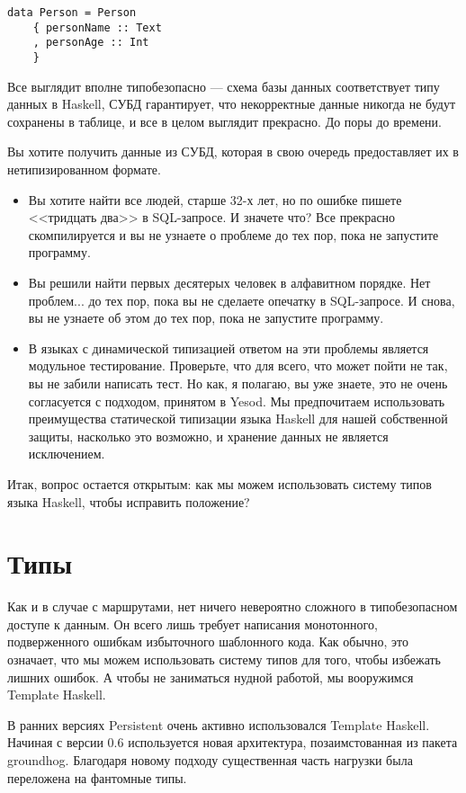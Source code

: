 \begin{lstlisting}
data Person = Person
    { personName :: Text
    , personAge :: Int
    }
\end{lstlisting}

Все выглядит вполне типобезопасно --- схема базы данных соответствует типу данных в Haskell, СУБД гарантирует, что некорректные данные никогда не будут сохранены в таблице, и все в целом выглядит прекрасно. До поры до времени.

Вы хотите получить данные из СУБД, которая в свою очередь предоставляет их в нетипизированном формате.

\begin{itemize}
  \item Вы хотите найти все людей, старше 32-х лет, но по ошибке пишете <<тридцать два>> в SQL-запросе. И значете что? Все прекрасно скомпилируется и вы не узнаете о проблеме до тех пор, пока не запустите программу.
  \item Вы решили найти первых десятерых человек в алфавитном порядке. Нет проблем... до тех пор, пока вы не сделаете опечатку в SQL-запросе. И снова, вы не узнаете об этом до тех пор, пока не запустите программу.
  \item В языках с динамической типизацией ответом на эти проблемы является модульное тестирование. Проверьте, что для всего, что может пойти не так, вы не забили написать тест. Но как, я полагаю, вы уже знаете, это не очень согласуется с подходом, принятом в Yesod. Мы предпочитаем использовать преимущества статической типизации языка Haskell для нашей собственной защиты, насколько это возможно, и хранение данных не является исключением.
\end{itemize}

Итак, вопрос остается открытым: как мы можем использовать систему типов языка Haskell, чтобы исправить положение?

\section{Типы} %

Как и в случае с маршрутами, нет ничего невероятно сложного в типобезопасном доступе к данным. Он всего лишь требует написания монотонного, подверженного ошибкам избыточного шаблонного кода. Как обычно, это означает, что мы можем использовать систему типов для того, чтобы избежать лишних ошибок. А чтобы не заниматься нудной работой, мы вооружимся Template Haskell.

\begin{remark}
В ранних версиях Persistent очень активно использовался Template Haskell. Начиная с версии 0.6 используется новая архитектура, позаимстованная из пакета groundhog. Благодаря новому подходу существенная часть нагрузки была переложена на фантомные типы.
\end{remark}

